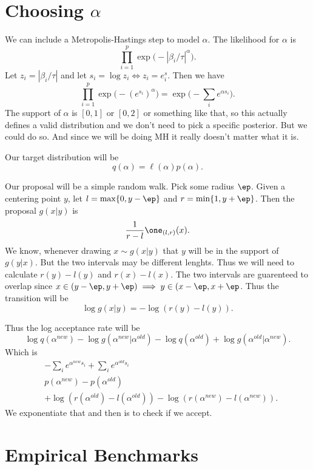 \documentclass{article}
\begin{document}
\section{Choosing $\alpha$}

We can include a Metropolis-Hastings step to model $\alpha$.  The likelihood for
$\alpha$ is 
\[
\prod_{i=1}^p \exp \Big( - |\beta_i / \tau|^\alpha \Big).
\]
Let $z_i = |\beta_i / \tau|$ and let $s_i = \log z_i \iff z_i = e^s_i$.  Then we
have
\[
\prod_{i=1}^p \exp \Big( - (e^{s_i})^{\alpha} \Big) = \exp \Big( - \sum_{i}
e^{\alpha s_i} \Big).
\]
The support of $\alpha$ is $[0,1]$ or $[0,2]$ or something like that, so this
actually defines a valid distribution and we don't need to pick a specific
posterior.  But we could do so.  And since we will be doing MH it really doesn't
matter what it is.

Our target distribution will be 
\[
q(\alpha) = \ell(\alpha) p(\alpha).
\]

Our proposal will be a simple random walk.  Pick some radius $\ep$.  Given a
centering point $y$, let $l = \max \{0, y-\ep\}$ and $r = \min \{1,y+\ep\}$.
Then the proposal $g(x|y)$ is
\[
\frac{1}{r-l} \one_{(l,r)}(x).
\]
We know, whenever drawing $x \sim g(x|y)$ that $y$ will be in the support of
$g(y|x)$.  But the two intervals may be different lenghts.  Thus we will need to
calculate $r(y)-l(y)$ and $r(x)-l(x)$.  The two intervals are guarenteed to
overlap since $x \in (y-\ep, y+\ep) \implies y \in (x-\ep, x+\ep$.  Thus the
transition will be
\[
\log g(x|y) = - \log (r(y) - l(y)).
\]

Thus the log acceptance rate will be
\[
\log q(\alpha^{new}) - \log g(\alpha^{new} | \alpha^{old}) - \log
q(\alpha^{old}) + \log g(\alpha^{old} | \alpha^{new}).
\]
Which is
\begin{align*}
& - \sum_{i} e^{\alpha^{new} s_i} + \sum_{i} e^{\alpha^{old} s_i} \\
& p(\alpha^{new}) - p(\alpha^{old}) \\
& + \log(r(\alpha^{old}) - l(\alpha^{old})) - \log(r(\alpha^{new}) - l(\alpha^{new})).
\end{align*}
We exponentiate that and then is to check if we accept.

\newpage

\section{Empirical Benchmarks}
\end{document}

